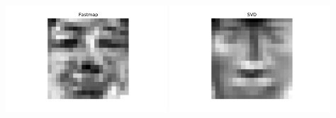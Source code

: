 \begin{enumerate}
\begin{center}
\includegraphics[width=0.45\textwidth]{Ex_03/Figures/fastmap.pdf}
\hfill
\includegraphics[width=0.45\textwidth]{Ex_03/Figures/svd.pdf}
\end{center}
\end{enumerate}

